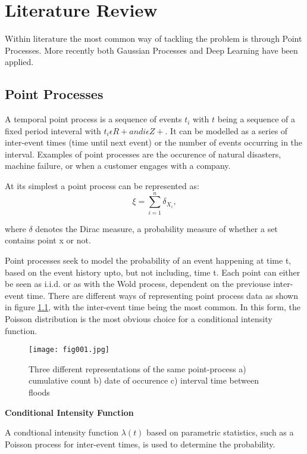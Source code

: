 
\chapter{Literature Review} %

\label{Chapter2} %

Within literature the most common way of tackling the problem is through Point Processes. More recently both Gaussian Processes and Deep Learning have been applied.

\section{Point Processes}
A temporal point process is a sequence of events ${t_i}$ with $t$ being a sequence of a fixed period inteveral with $t_i \epsilon R + and i \epsilon Z+$. It can be modelled as a series of inter-event times (time until next event) or the number of events occurring in the interval. Examples of point processes are the occurence of natural disasters, machine failure, or when a customer engages with a company.

At its simplest a point process can be represented as:
$${\xi =\sum _{i=1}^{n}\delta _{X_{i}},}$$

where $\delta$ denotes the Dirac measure, a probability measure of whether a set contains point x or not.

Point processes seek to model the probability of an event happening at time t, based on the event history upto, but not including, time t. Each point can either be seen as i.i.d. or as with the Wold process, dependent on the previouse inter-event time.
There are different ways of representing point process data as shown in figure \ref{fig:fig1}, with the inter-event time being the most common. In this form, the Poisson distribution is the most obvious choice for a conditional intensity function.

\begin{figure}[h!]
	\texttt{[image: fig001.jpg]}
	\caption{Three different representations of the same point-process a) cumulative count b) date of occurence c) interval time between floods}
	\label{fig:fig1}
\end{figure}

\textbf{Conditional Intensity Function} 

A condtional intensity function $\lambda(t)$ based on parametric statistics, such as a Poisson process for inter-event times, is used to determine the probability. 

